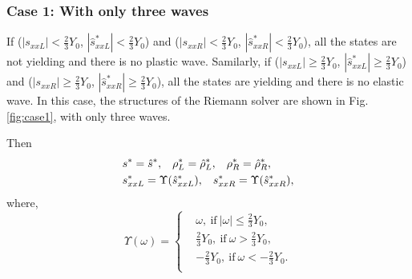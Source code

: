 \documentclass[review]{elsarticle}
\begin{document}
\subsubsection{Case 1: With only three waves}\label{sec:case1}
%
If ($|s_{xxL}|<\frac{2}{3}Y_0$, $|\hat{s}_{xxL}^*| < \frac{2}{3}Y_0$)  and  ($|s_{xxR}|<\frac{2}{3}Y_0$, $|\hat{s}_{xxR}^*| < \frac{2}{3}Y_0$), all the states are not yielding and there is no plastic wave. Samilarly, if ($|s_{xxL}|  \ge \frac{2}{3}Y_0$, $|\hat{s}_{xxL}^*| \ge  \frac{2}{3}Y_0$)  and  ($|s_{xxR}| \ge \frac{2}{3}Y_0$, $|\hat{s}_{xxR}^*| \ge  \frac{2}{3}Y_0$), all the states are yielding and there is no elastic wave.
In this case, the structures  of the Riemann solver are shown in Fig.\ref{fig:case1}, with only three waves.


Then
\begin{align}
&  s^* = \hat{s}^*,\hspace{0.3cm} \rho^*_L = \hat{\rho}_L^*, \hspace{0.3cm} \rho_R^* = \hat{\rho}_R^*,\\
&  s_{xxL}^*  = \Upsilon(\hat{s}_{xxL}^*),\hspace{0.3cm} s_{xxR}^*  = \Upsilon(\hat{s}_{xxR}^*),
\end{align}
where,
\begin{equation}\label{eq:upsilon}
  \Upsilon(\omega) = \left\{ \begin{aligned}
      &\omega, \  \text{if} \  |\omega| \le \frac{2}{3}Y_0,\\
      &\frac{2}{3}Y_0,  \ \text{if} \  \omega > \frac{2}{3}Y_0,\\
     &-\frac{2}{3}Y_0,  \  \text{if} \ \omega < -\frac{2}{3}Y_0.\\
 \end{aligned}\right.
 \end{equation}
\end{document}
